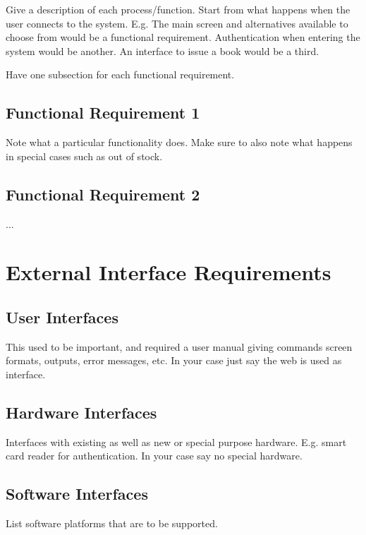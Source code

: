 \documentclass[a4wide]{article}
\begin{document}
Give a description of each process/function.
Start from what happens when the user connects to the system.
E.g.  The main screen and alternatives available to choose from would be 
a functional requirement.
Authentication when entering the system would be another.
An interface to issue a book would be a third.

Have one subsection for each functional requirement.

\subsection{Functional Requirement 1}


Note what a particular functionality does.
Make sure to also note what happens in special cases such as 
out of stock.

\subsection{Functional Requirement 2}

...


\section{External Interface Requirements}

\subsection{User Interfaces}

This used to be important, and required a user manual giving commands
screen formats, outputs, error messages, etc.
In your case just say the web is used as interface.

\subsection{Hardware Interfaces}

Interfaces with existing as well as new or special purpose hardware.
E.g. smart card reader for authentication.
In your case say no special hardware.

\subsection{Software Interfaces}

List software platforms that are to be supported.
\end{document}
